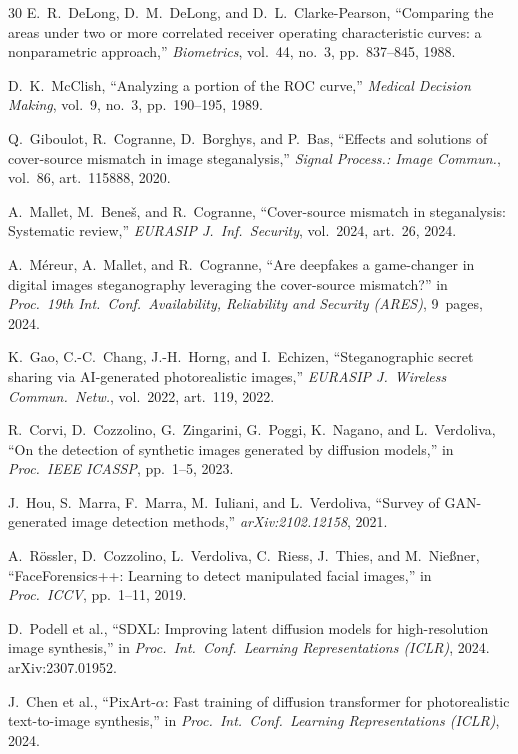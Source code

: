 \documentclass[10pt,twocolumn,a4paper]{article}
\begin{document}
\begin{thebibliography}{30}
E.~R.~DeLong, D.~M.~DeLong, and D.~L.~Clarke-Pearson,
``Comparing the areas under two or more correlated receiver operating characteristic curves: a nonparametric approach,''
\textit{Biometrics}, vol.~44, no.~3, pp.~837--845, 1988.

D.~K.~McClish,
``Analyzing a portion of the ROC curve,''
\textit{Medical Decision Making}, vol.~9, no.~3, pp.~190--195, 1989.

Q.~Giboulot, R.~Cogranne, D.~Borghys, and P.~Bas,
``Effects and solutions of cover-source mismatch in image steganalysis,''
\textit{Signal Process.: Image Commun.}, vol.~86, art.~115888, 2020.

A.~Mallet, M.~Bene\v{s}, and R.~Cogranne,
``Cover-source mismatch in steganalysis: Systematic review,''
\textit{EURASIP J.\ Inf.\ Security}, vol.~2024, art.~26, 2024.

A.~M\'{e}reur, A.~Mallet, and R.~Cogranne,
``Are deepfakes a game-changer in digital images steganography leveraging the cover-source mismatch?''
in \textit{Proc.\ 19th Int.\ Conf.\ Availability, Reliability and Security (ARES)}, 9~pages, 2024.

K.~Gao, C.-C.~Chang, J.-H.~Horng, and I.~Echizen,
``Steganographic secret sharing via AI-generated photorealistic images,''
\textit{EURASIP J.\ Wireless Commun.\ Netw.}, vol.~2022, art.~119, 2022.

R.~Corvi, D.~Cozzolino, G.~Zingarini, G.~Poggi, K.~Nagano, and L.~Verdoliva,
``On the detection of synthetic images generated by diffusion models,''
in \textit{Proc.\ IEEE ICASSP}, pp.~1--5, 2023.

J.~Hou, S.~Marra, F.~Marra, M.~Iuliani, and L.~Verdoliva,
``Survey of GAN-generated image detection methods,''
\textit{arXiv:2102.12158}, 2021.

A.~R\"ossler, D.~Cozzolino, L.~Verdoliva, C.~Riess, J.~Thies, and M.~Nie{\ss}ner,
``FaceForensics++: Learning to detect manipulated facial images,''
in \textit{Proc.\ ICCV}, pp.~1--11, 2019.

D.~Podell et al.,
``SDXL: Improving latent diffusion models for high-resolution image synthesis,''
in \textit{Proc.\ Int.\ Conf.\ Learning Representations (ICLR)}, 2024.
arXiv:2307.01952.

J.~Chen et al.,
``PixArt-$\alpha$: Fast training of diffusion transformer for photorealistic text-to-image synthesis,''
in \textit{Proc.\ Int.\ Conf.\ Learning Representations (ICLR)}, 2024.


\end{thebibliography}
\end{document}
